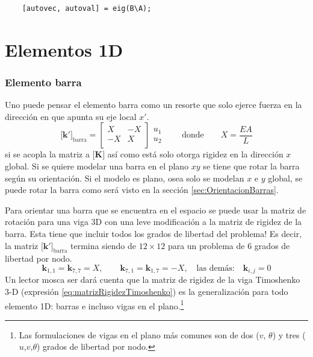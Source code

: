 \documentclass[11pt, a4paper,titlepage]{article}
\newcommand{\Mme}[1]{\boldsymbol{[}\mathbf{#1} \boldsymbol{]}}
\newcommand{\MK}{\Mme{K}}
\begin{document}
\begin{verbatim}
	[autovec, autoval] = eig(B\A);
\end{verbatim}
\part{Elementos 1D}

\section{Elemento barra}
Uno puede pensar el elemento barra como un resorte que solo ejerce fuerza en la dirección en que apunta su eje local $x'$.
\begin{equation} \label{eq:matrizBarra}
\Mme{k'}_{\mathrm{barra}} = \begin{bmatrix}
X & -X \\ 
-X & X\\
\end{bmatrix}\begin{array}{c}
u_1\\
u_2 
\end{array} \qquad \text{donde}\qquad X=\frac{EA}{L}
\end{equation}
si se acopla la matriz a $\MK$ así como está solo otorga rigidez en la dirección $x$ global. Si se quiere modelar una barra en el plano $xy$ se tiene que rotar la barra según su orientación. Si el modelo es plano, osea solo se modelan $x$ e $y$ global, se puede rotar la barra como será visto en la sección \ref{sec:OrientacionBarras}. 

Para orientar una barra que se encuentra en el espacio se puede usar la matriz de rotación para una viga 3D con una leve modificación a la matriz de rigidez de la barra. Esta tiene que incluir todos los grados de libertad del problema! Es decir, la matriz $\Mme{k'}_{\mathrm{barra}}$ termina siendo de $12 \times 12$ para un problema de 6 grados de libertad por nodo.
\[
\mathbf{k}_{1,1}=\mathbf{k}_{7,7}=X, \qquad \mathbf{k}_{7,1}=\mathbf{k}_{1,7}=-X, \quad \text{las demás:} \quad \mathbf{k}_{i,j} = 0
\]
Un lector mosca ser dará cuenta que la matriz de rigidez de la viga Timoshenko 3-D (expresión \ref{eq:matrizRigidezTimoshenko}) es la generalización para todo elemento 1D: barras e incluso vigas en el plano.\footnote{Las formulaciones de vigas en el plano más comunes son de dos ($v$, $\theta$) y tres ($u$,$v$,$\theta$) grados de libertad por nodo.}
\end{document}
